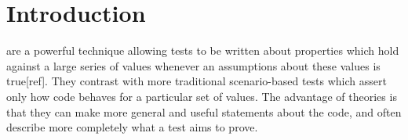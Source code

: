 \documentclass[10pt,journal,cspaper,compsoc]{IEEEtran}
\begin{document}
%
\IEEEpeerreviewmaketitle



\section{Introduction}
%
%

 are a powerful technique allowing tests to be written about properties which hold against a large series of values whenever an assumptions about these values is true[ref]. They contrast with more traditional scenario-based tests which assert only how code behaves for a particular set of values. The advantage of theories is that they can make more general and useful statements about the code, and often describe more completely what a test aims to prove. 
\end{document}

